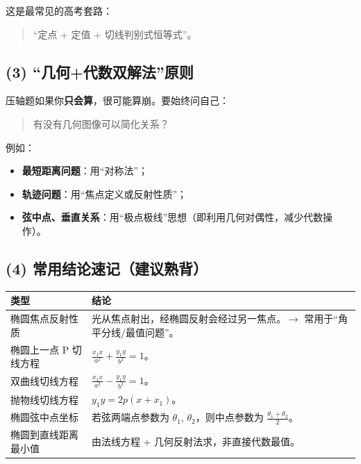 \documentclass{article}
\begin{document}
	这是最常见的高考套路：
	
	\begin{quote}
		``定点 + 定值 + 切线判别式恒等式''。
	\end{quote}
	
	\subsection*{(3) ``几何+代数双解法''原则}
	
	压轴题如果你\textbf{只会算}，很可能算崩。要始终问自己：
	
	\begin{quote}
		有没有几何图像可以简化关系？
	\end{quote}
	
	例如：
	
	\begin{itemize}
		\item \textbf{最短距离问题}：用``对称法''；
		\item \textbf{轨迹问题}：用``焦点定义或反射性质''；
		\item \textbf{弦中点、垂直关系}：用``极点极线''思想（即利用几何对偶性，减少代数操作）。
	\end{itemize}
	
	\subsection*{(4) 常用结论速记（建议熟背）}
	
	\begin{table}[h]
		\centering
		\begin{tabular}{|p{3cm}|p{8cm}|}
			\hline
			\textbf{类型} & \textbf{结论} \\
			\hline
			椭圆焦点反射性质 & 光从焦点射出，经椭圆反射会经过另一焦点。$\rightarrow$ 常用于``角平分线/最值问题''。 \\
			\hline
			椭圆上一点 P 切线方程 & $\frac{x_1x}{a^2} + \frac{y_1y}{b^2} = 1$。 \\
			\hline
			双曲线切线方程 & $\frac{x_1x}{a^2} - \frac{y_1y}{b^2} = 1$。 \\
			\hline
			抛物线切线方程 & $y_1y = 2p(x+x_1)$。 \\
			\hline
			椭圆弦中点坐标 & 若弦两端点参数为 $\theta_1$, $\theta_2$，则中点参数为 $\frac{\theta_1+\theta_2}{2}$。 \\
			\hline
			椭圆到直线距离最小值 & 由法线方程 + 几何反射法求，非直接代数最值。 \\
			\hline
		\end{tabular}
	\end{table}
	
\end{document}
